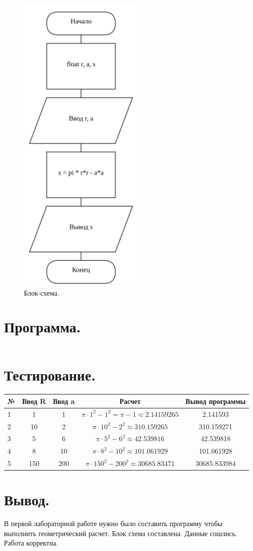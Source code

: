 \documentclass[
    oneside, %
    12pt %
]{extarticle}
\begin{document}
\begin{figure}[h] %
    \centering %
    \includegraphics[height=15cm]{scheme} 
    \caption{Блок-схема.} %
    \label{fig:scheme} %
\end{figure}


\section{Программа.}

\inputminted{C}{gitignore/main.c}

\section{Тестирование.}

\begin{tabular}{|l|cc|c|c|}
    \hline
    № & Ввод R & Ввод a & Расчет & Вывод программы \\
    \hline
    1 & 1   & 1   &$ \pi \cdot 1^2 - 1^2 = \pi - 1 \approx 2.14159265 $& 2.141593     \\
    2 & 10  & 2   &$ \pi \cdot 10^2 - 2^2 \approx 310.159265          $& 310.159271  \\
    3 & 5   & 6   &$ \pi \cdot 5^2 - 6^2 \approx 42.539816            $& 42.539818   \\
    4 & 8   & 10  &$ \pi \cdot 8^2 - 10^2 \approx 101.061929          $& 101.061928  \\
    5 & 150 & 200 &$ \pi \cdot 150^2 - 200^2 \approx 30685.83471      $& 30685.833984\\
    \hline
\end{tabular}

\section{Вывод.}

В первой лабораторной работе нужно было составить программу чтобы выполнить геометрический расчет. 
Блок схема составлена. Данные сошлись. Работа корректна.
\end{document}
